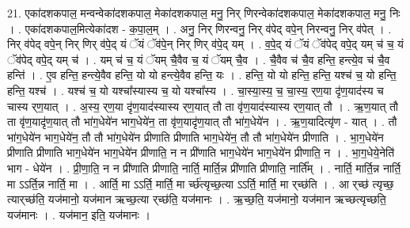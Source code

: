 \documentclass[17pt]{extarticle}
\begin{document}
21. एका॑दशकपाल॒ मन्वन्वेका॑दशकपाल॒ मेका॑दशकपाल॒ मनु॒ निर् णिरन्वेका॑दशकपाल॒ मेका॑दशकपाल॒ मनु॒ निः । . एका॑दशकपाल॒मित्येका॑दश - क॒पा॒ल॒म् । . अनु॒ निर् णिरन्वनु॒ निर् व॑पेद् वपे॒न् निरन्वनु॒ निर् व॑पेत् । . निर् व॑पेद् वपे॒न् निर् णिर् व॑पे॒द् यं ॅयं ॅव॑पे॒न् निर् णिर् व॑पे॒द् यम् । . व॒पे॒द् यं ॅयं ॅव॑पेद् वपे॒द् यम् च॑ च॒ यं ॅव॑पेद् वपे॒द् यम् च॑ । . यम् च॑ च॒ यं ॅयम् चै॒वैव च॒ यं ॅयम् चै॒व । . चै॒वैव च॑ चै॒व हन्ति॒ हन्त्ये॒व च॑ चै॒व हन्ति॑ । . ए॒व हन्ति॒ हन्त्ये॒वैव हन्ति॒ यो यो हन्त्ये॒वैव हन्ति॒ यः । . हन्ति॒ यो यो हन्ति॒ हन्ति॒ यश्च॑ च॒ यो हन्ति॒ हन्ति॒ यश्च॑ । . यश्च॑ च॒ यो यश्चा᳚स्यास्य च॒ यो यश्चा᳚स्य । . चा॒स्या॒स्य॒ च॒ चा॒स्य॒ र्‌ण॒या दृ॑ण॒याद॑स्य च चास्य र्‌ण॒यात् । . अ॒स्य॒ र्‌ण॒या दृ॑ण॒याद॑स्यास्य र्‌ण॒यात् तौ ता वृ॑ण॒याद॑स्यास्य र्‌ण॒यात् तौ । . ऋ॒ण॒यात् तौ ता वृ॑ण॒यादृ॑ण॒यात् तौ भा॑ग॒धेये॑न भाग॒धेये॑न॒ ता वृ॑ण॒यादृ॑ण॒यात् तौ भा॑ग॒धेये॑न । . ऋ॒ण॒यादित्यृ॑ण - यात् । . तौ भा॑ग॒धेये॑न भाग॒धेये॑न॒ तौ तौ भा॑ग॒धेये॑न प्रीणाति प्रीणाति भाग॒धेये॑न॒ तौ तौ भा॑ग॒धेये॑न प्रीणाति । . भा॒ग॒धेये॑न प्रीणाति प्रीणाति भाग॒धेये॑न भाग॒धेये॑न प्रीणाति॒ न न प्री॑णाति भाग॒धेये॑न भाग॒धेये॑न प्रीणाति॒ न । . भा॒ग॒धेये॒नेति॑ भाग - धेये॑न । . प्री॒णा॒ति॒ न न प्री॑णाति प्रीणाति॒ नार्ति॒ मार्ति॒न्न प्री॑णाति प्रीणाति॒ नार्ति᳚म् । . नार्ति॒ मार्ति॒न्न नार्ति॒ मा ऽऽर्ति॒न्न नार्ति॒ मा । . आर्ति॒ मा ऽऽर्ति॒ मार्ति॒ मा र्च्छ॑त्यृच्छ॒त्या ऽऽर्ति॒ मार्ति॒ मा र्‌च्छ॑ति । . आ र्‌च्छ॑ त्यृच्छ॒ त्यार्‌च्छ॑ति॒ यज॑मानो॒ यज॑मान ऋच्छ॒त्या र्‌च्छ॑ति॒ यज॑मानः । . ऋ॒च्छ॒ति॒ यज॑मानो॒ यज॑मान ऋच्छत्यृच्छति॒ यज॑मानः । . यज॑मान॒ इति॒ यज॑मानः । \newline
\pagebreak
{}
\end{document}
